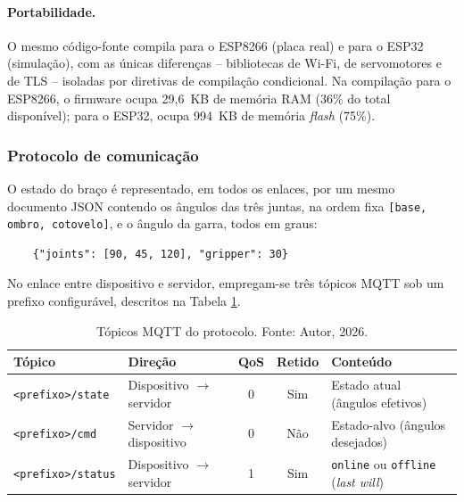\documentclass[12pt]{article}
\begin{document}
\paragraph{Portabilidade.} O mesmo código-fonte compila para o ESP8266 (placa real) e para o ESP32 (simulação), com as únicas diferenças -- bibliotecas de Wi-Fi, de servomotores e de TLS -- isoladas por diretivas de compilação condicional. Na compilação para o ESP8266, o firmware ocupa 29,6~KB de memória RAM (36\% do total disponível); para o ESP32, ocupa 994~KB de memória \textit{flash} (75\%).

\subsubsection{Protocolo de comunicação}
\label{subsec:protocolo}

O estado do braço é representado, em todos os enlaces, por um mesmo documento JSON contendo os ângulos das três juntas, na ordem fixa \texttt{[base, ombro, cotovelo]}, e o ângulo da garra, todos em graus:

\begin{verbatim}
    {"joints": [90, 45, 120], "gripper": 30}
\end{verbatim}

No enlace entre dispositivo e servidor, empregam-se três tópicos MQTT sob um prefixo configurável, descritos na Tabela \ref{tab:topicos}.

\begin{table}[htbp]
    \centering
    \small
    \caption{Tópicos MQTT do protocolo. Fonte: Autor, 2026.}
    \begin{tabular}{| l | p{2.6cm} | c | c | p{4.6cm} |}
        \hline
        \textbf{Tópico} & \textbf{Direção} & \textbf{QoS} & \textbf{Retido} & \textbf{Conteúdo} \\ \hline
        \texttt{<prefixo>/state} & Dispositivo $\rightarrow$ servidor & 0 & Sim & Estado atual (ângulos efetivos) \\ \hline
        \texttt{<prefixo>/cmd} & Servidor $\rightarrow$ dispositivo & 0 & Não & Estado-alvo (ângulos desejados) \\ \hline
        \texttt{<prefixo>/status} & Dispositivo $\rightarrow$ servidor & 1 & Sim & \texttt{online} ou \texttt{offline} (\textit{last will}) \\ \hline
    \end{tabular}
    \label{tab:topicos}
\end{table}
\end{document}
